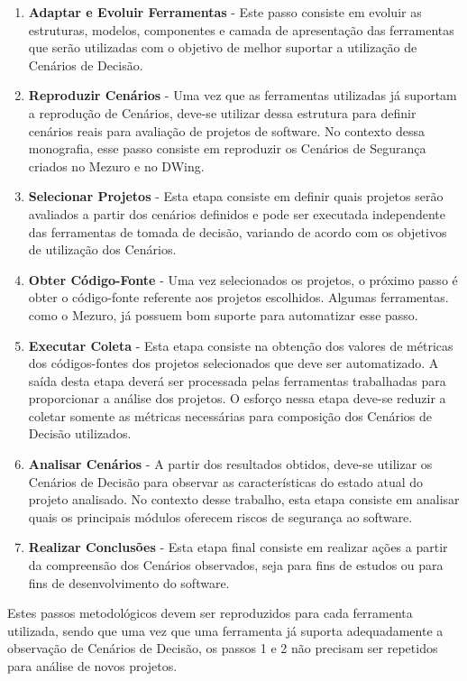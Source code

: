 \begin{enumerate}
\item \textbf{Adaptar e Evoluir Ferramentas} - Este passo consiste em evoluir as estruturas, modelos, componentes e camada de apresentação das ferramentas que serão utilizadas com o objetivo de melhor suportar a utilização de Cenários de Decisão.
\item \textbf{Reproduzir Cenários} - Uma vez que as ferramentas utilizadas já suportam a reprodução de Cenários, deve-se utilizar dessa estrutura para definir cenários reais para avaliação de projetos de software. No contexto dessa monografia, esse passo consiste em reproduzir os Cenários de Segurança criados no Mezuro e no DWing.
\item \textbf{Selecionar Projetos} - Esta etapa consiste em definir quais projetos serão avaliados a partir dos cenários definidos e pode ser executada independente das ferramentas de tomada de decisão, variando de acordo com os objetivos de utilização dos Cenários.
\item \textbf{Obter Código-Fonte} - Uma vez selecionados os projetos, o próximo passo é obter o código-fonte referente aos projetos escolhidos. Algumas ferramentas. como o Mezuro, já possuem bom suporte para automatizar esse passo.
\item \textbf{Executar Coleta} - Esta etapa consiste na obtenção dos valores de métricas dos códigos-fontes dos projetos selecionados que deve ser automatizado. A saída desta etapa deverá ser processada pelas ferramentas trabalhadas para proporcionar a análise dos projetos. O esforço nessa etapa deve-se reduzir a coletar somente as métricas necessárias para composição dos Cenários de Decisão utilizados.
\item \textbf{Analisar Cenários} - A partir dos resultados obtidos, deve-se utilizar os Cenários de Decisão para observar as características do estado atual do projeto analisado. No contexto desse trabalho, esta etapa consiste em analisar quais os principais módulos oferecem riscos de segurança ao software.
\item \textbf{Realizar Conclusões} - Esta etapa final consiste em realizar ações a partir da compreensão dos Cenários observados, seja para fins de estudos ou para fins de desenvolvimento do software. 
\end{enumerate}


Estes passos metodológicos devem ser reproduzidos para cada ferramenta utilizada, sendo que uma vez que uma ferramenta já suporta adequadamente a observação de Cenários de Decisão, os passos 1 e 2 não precisam ser repetidos para análise de novos projetos.


